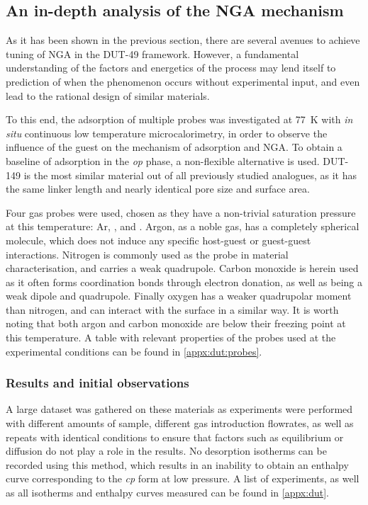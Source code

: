 
\subsection{An in-depth analysis of the NGA mechanism}%
\label{dut:indepth}

As it has been shown in the previous section, there are 
several avenues to achieve tuning of \gls{NGA} in the DUT-49 framework.
However, a fundamental understanding of the factors and 
energetics of the process may lend itself to prediction of
when the phenomenon occurs without 
experimental input, and even lead to the rational design of 
similar materials.

To this end, the adsorption of multiple probes was investigated 
at \SI{77}{\kelvin} with \textit{in situ} continuous low 
temperature microcalorimetry,
in order to observe the influence of the guest on the mechanism of
adsorption and \gls{NGA}. To obtain a baseline of adsorption in 
the \textit{op} phase, a non-flexible alternative is used. 
DUT-149 is the most similar material out of all previously studied
analogues, as it has the same linker length and nearly identical pore
size and surface area.

Four gas probes were used, chosen as they 
have a non-trivial saturation pressure at this temperature: Ar,
,  and . Argon, as a 
noble gas, has a completely spherical molecule, which does not 
induce any specific host-guest or guest-guest interactions. Nitrogen
is commonly used as the probe in material characterisation, 
and carries a weak quadrupole. Carbon monoxide is herein used 
as it often forms coordination bonds through electron donation,
as well as being a weak dipole and quadrupole.
Finally oxygen has a weaker quadrupolar moment than 
nitrogen, and can interact with the surface in a similar way.
It is worth noting that both argon and carbon monoxide are below 
their freezing point at this temperature. A table with 
relevant properties of the probes used at the experimental
conditions can be found in \autoref{appx:dut:probes}.

\subsubsection{Results and initial observations}

A large dataset was gathered
on these materials as experiments were performed with different 
amounts of sample, different gas introduction flowrates, as well as repeats
with identical conditions to ensure that factors such as 
equilibrium or diffusion do not play a role in the results. 
No desorption isotherms can be recorded using this method, which
results in an inability to obtain an enthalpy curve corresponding 
to the \textit{cp} form at low pressure. A list 
of experiments, as well as all isotherms and enthalpy curves measured can
be found in \autoref{appx:dut}.

